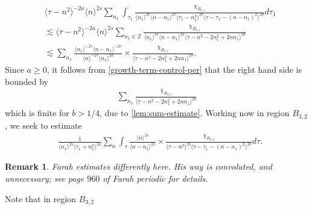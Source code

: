 \documentclass[12pt,reqno]{amsart}
\numberwithin{equation}{section}  %
\newcommand{\zz}{\mathbb{Z}}
\newtheorem{remark}[theorem]{Remark}
\begin{document}
\begin{equation}
  \label{region-a31-case-6}
\begin{split}
& \langle \tau - n^{2}  \rangle ^{-2a} \langle n
    \rangle ^{2s}
    \sum_{n_{1}} \int_{\tau_{1}} \frac{\chi_{B_{3,1}}}{ \langle n_{1} \rangle ^{2s} \langle n-n_{1} \rangle ^{2s} 
\langle \tau_{1} - n_{1}^{2}  \rangle^{2b} \langle  \tau - \tau_{1} - (n -
n_{1})^{2}  \rangle^{2b}}
d \tau_1 
\\
& \lesssim \langle \tau - n^{2} \rangle ^{-2a} \langle n \rangle ^{2s}
\sum_{n_{1} \in
\zz}  \frac{\chi_{B_{3,1}}}{\langle n_{1} \rangle ^{2s} \langle n - n_{1} \rangle
^{2s} \langle \tau - n^{2} - 2n_{1}^{2} + 2nn_{1}  \rangle^{2b} }
\\
& \lesssim 
\sum_{n_{1}}  \frac{\langle n_1 \rangle ^{-2s} \langle n - n_{1} \rangle ^{-2s}}{\langle
n \rangle ^{-2s} \langle n_{1} \rangle
^{2a}} \times \frac{\chi_{B_{3,1}}}{\langle \tau - n^{2} - 2n_{1}^{2} + 2nn_{1}
\rangle^{2b} }.
\end{split}
\end{equation}
%
%
Since $a \ge 0$, it follows from \eqref{growth-term-control-per} that the right
hand side is bounded by
%
%
%
%
\begin{equation*}
\begin{split}
  \sum_{n_{1}}   \frac{\chi_{B_{3,1}}}{\langle \tau - n^{2} - 2n_{1}^{2} + 2nn_{1}
\rangle^{2b} }
\end{split}
\end{equation*}
%
%
%
%
%
%
which is finite for $b > 1/4$, due to \cref{lem:sum-estimate}. 
Working now in region $B_{3,2}$, we seek to estimate 
\begin{equation}
  \label{region-B-3-split-3}
\begin{split}
  &  \frac{1}{\langle n_{1} \rangle ^{2s}
  \langle \tau_{1} + n_{1}^{2} \rangle
  ^{2a}} \sum_{n} \int_{\tau} \frac{\langle n \rangle ^{2s}}{\langle
  n - n_{1}\rangle ^{2s}}  \times \frac{\chi_{B_{3,2}}}{\langle
  \tau - n^{2} \rangle^{2b}  \langle \tau - \tau_{1} - (n - n_{1})^{2} \rangle^{2b}
  } d \tau.
\end{split}
\end{equation}
%
%
\begin{framed}
\begin{remark}
Farah estimates differently here. His
way is convoluted, and unnecessary; see page $960$ of Farah periodic for details.
\label{rem:fara-dif}
\end{remark}
\end{framed}
%
%
%
Note that in region $B_{3,2}$
\end{document}

